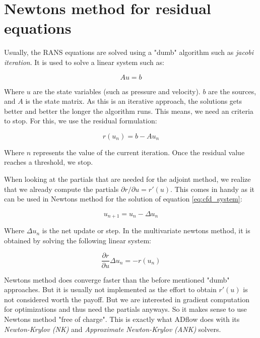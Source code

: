 \section{Newtons method for residual equations}
\label{sec:newtons_method}
Usually, the RANS equations are solved using a "dumb" algorithm such as
\textit{jacobi iteration}. It is used to solve a linear system such as:

\begin{equation}
    \label{eq:cfd_system}
    Au = b
\end{equation}

\noindent Where $u$ are the state variables (such as pressure and velocity). $b$
are the sources, and $A$ is the state matrix. As this is an iterative approach,
the solutions gets better and better the longer the algorithm runs. This means,
we need an criteria to stop. For this, we use the residual formulation:

\begin{equation}
    r(u_n) = b - Au_n 
\end{equation}
 
\noindent Where $n$ represents the value of the current iteration. Once the
residual value reaches a threshold, we stop.

When looking at the partials that are needed for the adjoint method, we realize
that we already compute the partials $\partial r / \partial u = r'(u)$. This
comes in handy as it can be used in Newtons method for the solution of equation
\ref{eq:cfd_system}:

\begin{equation}
    u_{n+1} = u_n - \Delta u_n
\end{equation}

\noindent Where $\Delta u_n$ is the net update or step. In the multivariate
newtons method, it is obtained by solving the following linear system:

\begin{equation}
    \frac{\partial r}{\partial u} \Delta u_n = - r(u_n)
\end{equation}

\noindent Newtons method does converge faster than the before mentioned "dumb"
approaches. But it is usually not implemented as the effort to obtain $r'(u)$
is not considered worth the payoff. But we are interested in gradient
computation for optimizations and thus need the partials anyways. So it makes
sense to use Newtons method "free of charge". This is exactly what ADflow does
with its \textit{Newton-Krylov (NK)} and \textit{Approximate Newton-Krylov
(ANK)} solvers. \cite{mdobook}








